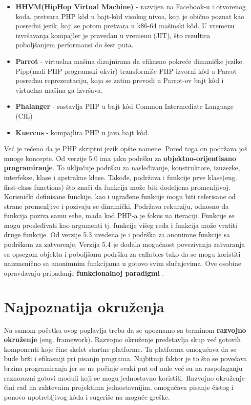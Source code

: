 \documentclass[a4paper]{article}
\begin{document}
{\begin{itemize}
\item \textbf{HHVM(HipHop Virtual Machine)}\cite{hhvm} - razvijen na Facebook-u i otvorenog koda, pretvara PHP k\^{o}d u bajt-k\^{o}d visokog nivoa, koji je obično poznat kao posredni jezik, koji se potom pretvara u k86-64 mašinski k\^{o}d. U vremenu izvršavanja kompajler je pravedan u vremenu (JIT), što rezultira poboljšanjem performansi do šest puta.
\item \textbf{Parrot}\cite{parrot} - virtuelna mašina dizajnirana da efikasno pokreće dimaničke jezike. Pipp(mali PHP programski okvir) transformiše PHP izvorni k\^{o}d u Parrot posrednu reprezentaciju, koja se zatim prevodi u Parrot-ov bajt k\^{o}d i virtuelna mašina ga izvršava.
\item \textbf{Phalanger} - sastavlja PHP u bajt k\^{o}d Common Intermediate Language (CIL)
\item \textbf{Kuercus} - kompajlira PHP u java bajt k\^{o}d.
\end{itemize}

Već je rečeno da je PHP skriptni jezik opšte namene. Pored toga on podržava još mnoge koncepte. Od verzije 5.0 ima jaku podršku za \textbf{objektno-orijentisano programiranje}. To uključuje podršku za nasleđivanje, konstruktore, izuzezke, interfekse, klase i apstrakne klase. Takođe, podržava i funkcije prve klase(eng. first-class functions) što znači da funkcija može biti dodeljena promenljivoj. Korisnički definisane funckije, kao i ugrađene funkcije mogu biti referisane od strane promenljive i pozivaju se dinamički. Podržava rekurziju, odnosno da funkcija poziva samu sebe, mada kod PHP-a je fokus na iteraciji. Funkcije se mogu prosleđivati kao argumenti tj. funkcije višeg reda i funkcija može vratiti druge funkcije. Od verzije 5.3 uvedena je i podrška za anonimne funkcije sa podrškom za zatvorenje. Verzija 5.4 je dodala mogućnost povezivanja zatvaranja sa opsegom objekta i poboljšanu podršku za callables tako da se mogu koristiti naizmenično sa anonimnim funkcijama u gotovo svim slučajevima. Ove osobine opravdavaju pripadanje \textbf{funkcionalnoj paradigmi} \cite{phpSrbija}.


\section{Najpoznatija okruženja}
Na samom početku ovog poglavlja treba da se upoznamo sa terminom \textbf{razvojno okruženje} (eng. framework). Razvojno okruženje predstavlja skup već gotovih komponenti koje čine skelet startne platforme. Ta platforma omogućava da se bude brži i efikasniji pri pisanju programa. Najbitniji faktor je to što se povećava brzina programiranja jer se ne počinje svaki put od nule već su na raspolaganju raznorazni gotovi moduli koji se mogu jednostavno koristiti. Razvojno okruženje čini rad na zahtevnim projektima jednostavnijim, omogućava pisanje čistog i ponovo upotrebljivog k\^{o}da i  sugeriše na moguće greške.

}
\end{document}
